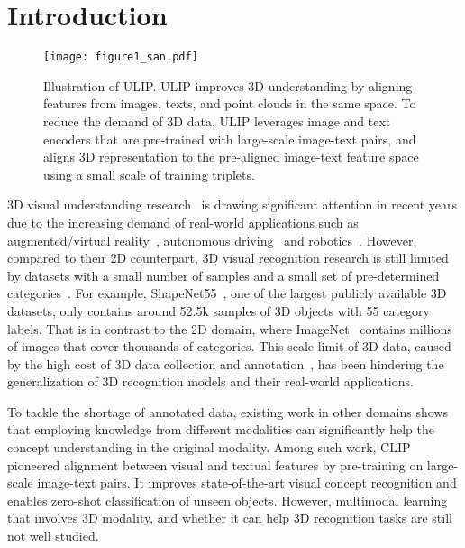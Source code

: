 \section{Introduction}
\label{sec:intro}

 
\begin{figure}[hbt]
    \centering
    \texttt{[image: figure1\_san.pdf]}
    \caption{Illustration of ULIP. ULIP improves 3D understanding by aligning features from images, texts, and point clouds in the same space. To reduce the demand of 3D data, ULIP leverages image and text encoders that are pre-trained with large-scale image-text pairs, and aligns 3D representation to the pre-aligned image-text feature space using a small scale of training triplets. }
    \label{fig:alignment}
\end{figure}

3D visual understanding research~\cite{landrieu2018large, hu2020randla, liu2019densepoint, li2021lidar, graham20183d, choy20163d} is drawing significant attention in recent years due to the increasing demand of real-world applications such as augmented/virtual reality~\cite{vu2022softgroup, liu2021group, misra2021end, armeni20163d}, autonomous driving~\cite{yin2021center, li2022deepfusion} and robotics~\cite{wojek2011monocular, cadena2016multi}.
However, compared to their 2D counterpart, 3D visual recognition research is still limited by datasets with a small number of samples and a small set of pre-determined categories~\cite{Uy_2019_ICCV, wu20153d}.
For example, ShapeNet55~\cite{chang2015shapenet}, one of the largest publicly available 3D datasets, only contains around 52.5k samples of 3D objects with 55 category labels. 
That is in contrast to the 2D domain, where ImageNet~\cite{deng2009imagenet} contains millions of images that cover thousands of categories.
This scale limit of 3D data, caused by the high cost of 3D data collection and annotation~\cite{yu2022point, chang2015shapenet, goyal2021revisiting, wu20153d}, has been hindering the generalization of 3D recognition models and their real-world applications.  

To tackle the shortage of annotated data,  existing work in other domains shows that employing knowledge from different modalities can significantly help the concept understanding in the original modality\cite{radford2021learning,xing2019adaptive}. 
Among such work, CLIP~\cite{radford2021learning} pioneered alignment between visual and textual features by pre-training on large-scale image-text pairs. It improves state-of-the-art visual concept recognition and enables zero-shot classification of unseen objects.
However, multimodal learning that involves 3D modality, and whether it can help 3D recognition tasks are still not well studied.

